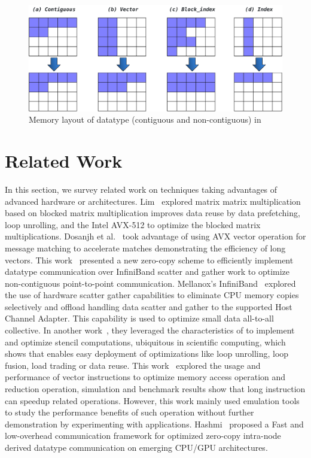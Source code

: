 \documentclass[conference]{IEEEtran}
\begin{document}
\begin{figure}[ht]
  \centering
  \includegraphics[width=0.8\linewidth]{ddt_ompi.pdf}
  \caption{Memory layout of datatype (contiguous and non-contiguous) in~\mpi}
  \label{fig:ddt_ompi}
\end{figure}

\section{Related Work}\label{sec:related}
In this section, we survey related work on techniques taking advantages of
advanced hardware or architectures.
%
Lim~\cite{Lim2018} explored matrix matrix multiplication based on blocked matrix multiplication
improves data reuse by data prefetching, loop unrolling, and the Intel AVX-512 to optimize
the blocked matrix multiplications.
%
Dosanjh et al.~\cite{tag-match} took advantage of using AVX vector operation for
\mpi message matching to accelerate matches demonstrating the efficiency
of long vectors.
%
This work~\cite{Berlin04} presented a new
zero-copy scheme to efficiently implement datatype communication over InfiniBand
scatter and gather work to optimize non-contiguous point-to-point communication.
%
Mellanox's InfiniBand~\cite{Gainaru2016} explored the use of hardware scatter
gather capabilities to eliminate CPU memory copies selectively and offload handling
data scatter and gather to the supported Host Channel Adapter. This capability is
used to optimize small data all-to-all collective.
%
In another work~\cite{sve-stencil}, they leveraged the characteristics of \sve to implement and optimize
stencil computations, ubiquitous in scientific computing, which shows
that \sve enables easy deployment of optimizations like loop unrolling,
loop fusion, load trading or data reuse.
%
This work~\cite{dongsve} explored the usage and performance of \sve vector instructions to optimize
memory access operation and reduction operation, simulation and benchmark results show that \sve
long instruction can speedup related operations. However, this work mainly used emulation tools to
study the performance benefits of such operation without further demonstration by experimenting
with applications.
%
Hashmi~\cite{ASHMI20201} proposed a Fast and low-overhead communication framework
for optimized zero-copy intra-node derived datatype communication on emerging CPU/GPU architectures.
%
\end{document}

